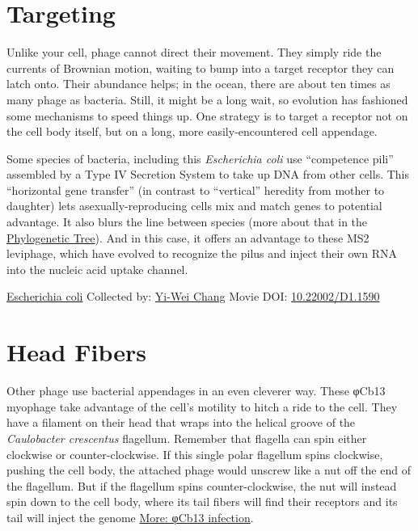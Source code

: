 \documentclass[]{tufte-book}
\begin{document}
\hypertarget{targeting}{%
\section{Targeting}\label{targeting}}

Unlike your cell, phage cannot direct their movement. They simply ride the currents of Brownian motion, waiting to bump into a target receptor they can latch onto. Their abundance helps; in the ocean, there are about ten times as many phage as bacteria. Still, it might be a long wait, so evolution has fashioned some mechanisms to speed things up. One strategy is to target a receptor not on the cell body itself, but on a long, more easily-encountered cell appendage.

Some species of bacteria, including this \emph{Escherichia coli} use ``competence pili'' assembled by a Type IV Secretion System to take up DNA from other cells. This ``horizontal gene transfer'' (in contrast to ``vertical'' heredity from mother to daughter) lets asexually-reproducing cells mix and match genes to potential advantage. It also blurs the line between species (more about that in the \protect\hyperlink{tree}{Phylogenetic Tree}). And in this case, it offers an advantage to these MS2 leviphage, which have evolved to recognize the pilus and inject their own RNA into the nucleic acid uptake channel.



\hypertarget{htmlwidget-5e3ada22780559e7ecda}{}

\label{fig:10-5}\protect\hyperlink{tree}{Escherichia coli} Collected by: \protect\hyperlink{yi-wei_chang}{Yi-Wei Chang} Movie DOI: \href{https://doi.org/10.22002/D1.1590}{10.22002/D1.1590}

\hypertarget{head-fibers}{%
\section{Head Fibers}\label{head-fibers}}

Other phage use bacterial appendages in an even cleverer way. These φCb13 myophage take advantage of the cell's motility to hitch a ride to the cell. They have a filament on their head that wraps into the helical groove of the \emph{Caulobacter crescentus} flagellum. Remember that flagella can spin either clockwise or counter-clockwise. If this single polar flagellum spins clockwise, pushing the cell body, the attached phage would unscrew like a nut off the end of the flagellum. But if the flagellum spins counter-clockwise, the nut will instead spin down to the cell body, where its tail fibers will find their receptors and its tail will inject the genome \protect\hyperlink{ux3c6Cb13_infection}{More: φCb13 infection}.
\end{document}
